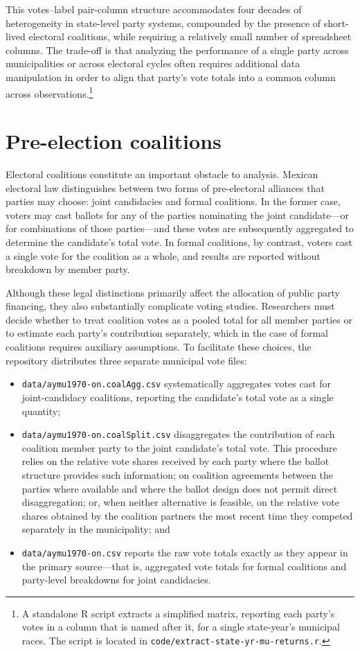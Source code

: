 \documentclass[letter,12pt]{article}
\begin{document}
This votes--label pair-column structure accommodates four decades of heterogeneity in state-level party systems, compounded by the presence of short-lived electoral coalitions, while requiring a relatively small number of spreadsheet columns. The trade-off is that analyzing the performance of a single party across municipalities or across electoral cycles often requires additional data manipulation in order to align that party's vote totals into a common column across observations.\footnote{A standalone R script extracts a simplified matrix, reporting each party's votes in a column that is named after it, for a single state-year's municipal races. The script is located in \verb|code/extract-state-yr-mu-returns.r|.}

\section{Pre-election coalitions}\label{S:coalitions}

Electoral coalitions constitute an important obstacle to analysis. Mexican electoral law distinguishes between two forms of pre-electoral alliances that parties may choose: joint candidacies and formal coalitions. In the former case, voters may cast ballots for any of the parties nominating the joint candidate---or for combinations of those parties---and these votes are subsequently aggregated to determine the candidate's total vote. In formal coalitions, by contrast, voters cast a single vote for the coalition as a whole, and results are reported without breakdown by member party.

Although these legal distinctions primarily affect the allocation of public party financing, they also substantially complicate voting studies. Researchers must decide whether to treat coalition votes as a pooled total for all member parties or to estimate each party's contribution separately, which in the case of formal coalitions requires auxiliary assumptions. To facilitate these choices, the repository distributes three separate municipal vote files:

\begin{itemize}
\item \verb|data/aymu1970-on.coalAgg.csv| systematically aggregates votes cast for joint-candidacy coalitions, reporting the candidate's total vote as a single quantity;
\item \verb|data/aymu1970-on.coalSplit.csv| disaggregates the contribution of each coalition member party to the joint candidate's total vote. This procedure relies on the relative vote shares received by each party where the ballot structure provides such information; on coalition agreements between the parties where available and where the ballot design does not permit direct disaggregation; or, when neither alternative is feasible, on the relative vote shares obtained by the coalition partners the most recent time they competed separately in the municipality; and
\item \verb|data/aymu1970-on.csv| reports the raw vote totals exactly as they appear in the primary source---that is, aggregated vote totals for formal coalitions and party-level breakdowns for joint candidacies.
\end{itemize}
\end{document}
